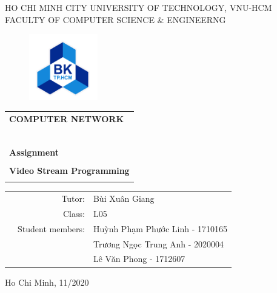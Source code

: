 \documentclass[a4paper]{article}
\begin{document}
\begin{titlepage}

\begin{center}
HO CHI MINH CITY UNIVERSITY OF TECHNOLOGY, VNU-HCM\\
FACULTY OF COMPUTER SCIENCE \& ENGINEERNG
\end{center}

\vspace{1cm}

\begin{figure}[H]
\begin{center}
\includegraphics[width=3cm]{hcmut.png}
\end{center}
\end{figure}

\vspace{1cm}


\begin{center}
\begin{tabular}{c}
\multicolumn{1}{l}{\textbf{{\Large COMPUTER NETWORK}}}\\
~~\\
\hline
\\
\multicolumn{1}{l}{\textbf{{\Large Assignment}}}\\
\\
\textbf{\Huge Video Stream Programming}\\
\\
\hline
\end{tabular}
\end{center}

\vspace{3cm}

\begin{table}[h]
\begin{tabular}{rrl}

\hspace{5 cm} & Tutor: & Bùi Xuân Giang\\
& Class: & L05\\
& Student members: & Huỳnh Phạm Phước Linh - 1710165 \\
& & Trương Ngọc Trung Anh - 2020004 \\
& & Lê Văn Phong - 1712607 \\


\end{tabular}
\end{table}

\begin{center}
{\footnotesize Ho Chi Minh, 11/2020}
\end{center}
\end{titlepage}
\end{document}
